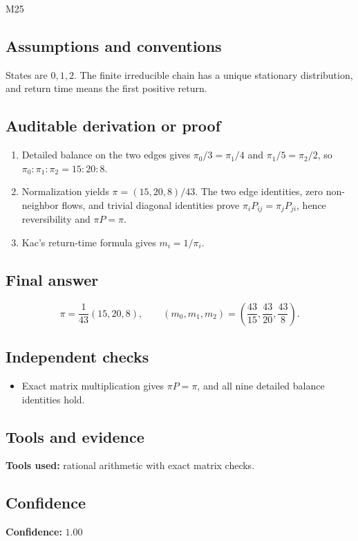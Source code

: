 \documentclass[11pt]{article}
\begin{document}
\begin{mprsolution}{M25}
\subsection*{Assumptions and conventions}
States are \(0,1,2\).  The finite irreducible chain has a unique stationary
distribution, and return time means the first positive return.
\subsection*{Auditable derivation or proof}
\begin{enumerate}[label=\textbf{Step \arabic*:},leftmargin=*]
\item Detailed balance on the two edges gives
\(\pi_0/3=\pi_1/4\) and \(\pi_1/5=\pi_2/2\), so
\(\pi_0:\pi_1:\pi_2=15:20:8\).
\item Normalization yields \(\pi=(15,20,8)/43\).  The two edge identities,
zero non-neighbor flows, and trivial diagonal identities prove
\(\pi_iP_{ij}=\pi_jP_{ji}\), hence reversibility and \(\pi P=\pi\).
\item Kac's return-time formula gives \(m_i=1/\pi_i\).
\end{enumerate}
\subsection*{Final answer}
\[
\boxed{\displaystyle
\pi=\frac1{43}(15,20,8),\qquad
(m_0,m_1,m_2)=\left(\frac{43}{15},\frac{43}{20},\frac{43}{8}\right).}
\]
\subsection*{Independent checks}
\begin{itemize}[leftmargin=*]
\item Exact matrix multiplication gives \(\pi P=\pi\), and all nine detailed
balance identities hold.
\end{itemize}
\subsection*{Tools and evidence}
\textbf{Tools used:} rational arithmetic with exact matrix checks.
\subsection*{Confidence}
\textbf{Confidence:} \(1.00\)
\end{mprsolution}
\end{document}
